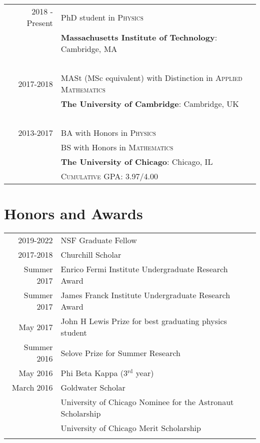 \documentclass[10pt]{article} %
\begin{document}
\begin{tabular}{rl}	
2018 - Present & PhD student in \textsc{Physics}\\
& \textbf{Massachusetts Institute of Technology}: Cambridge, MA\\
\ \\
2017-2018 & MASt (MSc equivalent) with Distinction in \textsc{Applied Mathematics}\\
 &\textbf{The University of Cambridge}: Cambridge, UK\\
\ \\
2013-2017 & BA with Honors in \textsc{Physics}\\
& BS with Honors in \textsc{Mathematics}\\
&\textbf{The University of Chicago}: Chicago, IL\\
&\normalsize \textsc{Cumulative GPA}: 3.97/4.00 \\

\end{tabular}



\section{Honors and Awards}

\begin{tabular}{rl}
2019-2022 & NSF Graduate Fellow \\

2017-2018 & Churchill Scholar \\

Summer 2017 & Enrico Fermi Institute Undergraduate Research Award\\

Summer 2017 & James Franck Institute Undergraduate Research Award\\

May 2017 & John H Lewis Prize for best graduating physics student\\

Summer 2016& Selove Prize for Summer Research\\

May 2016& Phi Beta Kappa (3$^{\mathrm{rd}}$ year) \\

March 2016 & Goldwater Scholar\\

\com{\textsc{Mar.} 2016 & University of Chicago Nominee for the Astronaut Scholarship\\}

\com{\textsc{Sept.} 2013 & University of Chicago Merit Scholarship\\}

\end{tabular}
\end{document}
